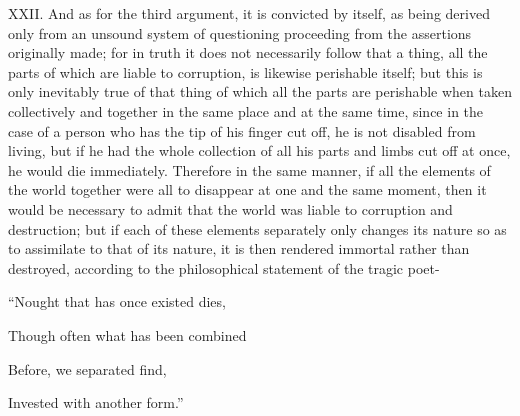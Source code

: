 XXII. And as for the third argument, it is convicted by itself, as being derived only from an unsound
system of questioning proceeding from the assertions originally made; for in truth it does not
necessarily follow that a thing, all the parts of which are liable to corruption, is likewise perishable
itself; but this is only inevitably true of that thing of which all the parts are perishable when taken
collectively and together in the same place and at the same time, since in the case of a person
who has the tip of his finger cut off, he is not disabled from living, but if he had the whole collection
of all his parts and limbs cut off at once, he would die immediately. Therefore in the same manner,
if all the elements of the world together were all to disappear at one and the same moment, then it
would be necessary to admit that the world was liable to corruption and destruction; but if each of
these elements separately only changes its nature so as to assimilate to that of its nature, it is then
rendered immortal rather than destroyed, according to the philosophical statement of the tragic
poet-

``Nought that has once existed dies,

Though often what has been combined

Before, we separated find,

Invested with another form.''

